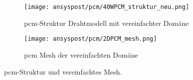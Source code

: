 \begin{figure}[!htb]
    \centering
    \begin{subfigure}[t]{0.7\textwidth}
        \centering
        \texttt{[image: ansyspost/pcm/40WPCM\_struktur\_neu.png]}
        \caption{\acs{pcm}-Struktur Drahtmodell mit vereinfachter Domäne}\label{fig:pcm_struktur}
    \end{subfigure}
    \hfill
    \begin{subfigure}[t]{0.15\textwidth}
        \centering
        \texttt{[image: ansyspost/pcm/2DPCM\_mesh.png]}
        \caption{\acs{pcm} Mesh der vereinfachten Domäne}\label{fig:pcm_mesh}
    \end{subfigure}
    \caption{\acs{pcm}-Struktur und vereinfachtes Mesh.}\label{fig:pcm_geometrien}
\end{figure}

